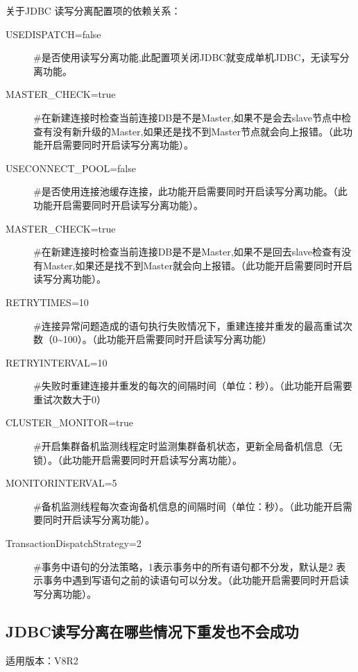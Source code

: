 \documentclass[a4,10pt,oneside,english]{sphinxmanual}
\begin{document}
关于JDBC 读写分离配置项的依赖关系：
\begin{description}
\item[{USEDISPATCH=false}] \leavevmode
\#是否使用读写分离功能,此配置项关闭JDBC就变成单机JDBC，无读写分离功能。

\item[{MASTER\_CHECK=true}] \leavevmode
\#在新建连接时检查当前连接DB是不是Master,如果不是会去slave节点中检查有没有新升级的Master,如果还是找不到Master节点就会向上报错。（此功能开启需要同时开启读写分离功能）。

\item[{USECONNECT\_POOL=false}] \leavevmode
\#是否使用连接池缓存连接，此功能开启需要同时开启读写分离功能。（此功能开启需要同时开启读写分离功能）。

\item[{MASTER\_CHECK=true}] \leavevmode
\#在新建连接时检查当前连接DB是不是Master,如果不是回去slave检查有没有Master,如果还是找不到Master就会向上报错。（此功能开启需要同时开启读写分离功能）。

\item[{RETRYTIMES=10}] \leavevmode
\#连接异常问题造成的语句执行失败情况下，重建连接并重发的最高重试次数（0\textasciitilde{}100）。（此功能开启需要同时开启读写分离功能）

\item[{RETRYINTERVAL=10}] \leavevmode
\#失败时重建连接并重发的每次的间隔时间（单位：秒）。（此功能开启需要重试次数大于0）

\item[{CLUSTER\_MONITOR=true}] \leavevmode
\#开启集群备机监测线程定时监测集群备机状态，更新全局备机信息（无锁）。（此功能开启需要同时开启读写分离功能）。

\item[{MONITORINTERVAL=5}] \leavevmode
\#备机监测线程每次查询备机信息的间隔时间（单位：秒）。（此功能开启需要同时开启读写分离功能）。

\item[{TransactionDispatchStrategy=2}] \leavevmode
\#事务中语句的分法策略，1表示事务中的所有语句都不分发，默认是2 表示事务中遇到写语句之前的读语句可以分发。（此功能开启需要同时开启读写分离功能）。

\end{description}


\subsection{JDBC读写分离在哪些情况下重发也不会成功}
\label{\detokenize{interface/jdbc:id8}}
适用版本：V8R2
\end{document}

